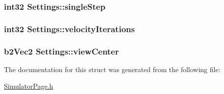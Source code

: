 \hypertarget{structSettings_ab26356e864848394be4ae8bc76850d05}{
\subsubsection[{single\-Step}]{\setlength{\rightskip}{0pt plus 5cm}int32 Settings\-::single\-Step}}\label{structSettings_ab26356e864848394be4ae8bc76850d05}
\hypertarget{structSettings_aef56168e9043d5a6f264a57fc0d0823a}{
\subsubsection[{velocity\-Iterations}]{\setlength{\rightskip}{0pt plus 5cm}int32 Settings\-::velocity\-Iterations}}\label{structSettings_aef56168e9043d5a6f264a57fc0d0823a}
\hypertarget{structSettings_a9f73ff7bfe24c0ec00f00637ad660afa}{
\subsubsection[{view\-Center}]{\setlength{\rightskip}{0pt plus 5cm}b2\-Vec2 Settings\-::view\-Center}}\label{structSettings_a9f73ff7bfe24c0ec00f00637ad660afa}


The documentation for this struct was generated from the following file\-:\begin{DoxyCompactItemize}
\item 
\hyperlink{SimulatorPage_8h}{Simulator\-Page.\-h}\end{DoxyCompactItemize}
